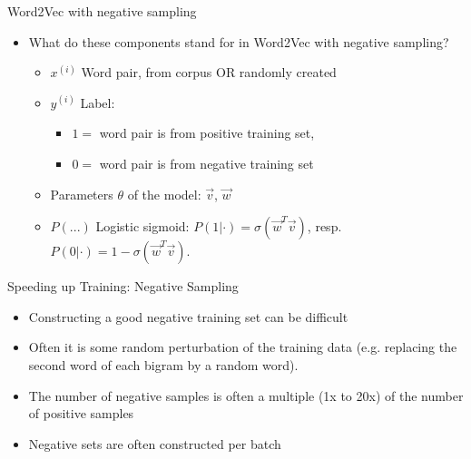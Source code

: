 \documentclass[11pt,compress,t,notes=noshow, xcolor=table]{beamer}
\begin{document}

\begin{vbframe}{Word2Vec with negative sampling}

\vfill

\begin{itemize}
	\item \ques What do these components stand for in Word2Vec with negative sampling?
		\begin{itemize}
			\item $x^{(i)}$ Word pair, from corpus OR randomly created
			\item $y^{(i)}$ Label: 
					\begin{itemize}
						\item $1 = $ word pair is from positive training set,
						\item $0 = $ word pair is from negative training set
					\end{itemize} 
			\item Parameters $\theta$ of the model: $\vec v$, $\vec w$
			\item $P(...)$ Logistic sigmoid: $P(1|\cdot) = \sigma(\vec w^T \vec v)$, resp. $P(0|\cdot) = 1-\sigma(\vec w^T \vec v)$.
		\end{itemize}
\end{itemize}

\vfill

\end{vbframe}


\begin{vbframe}{Speeding up Training: Negative Sampling}

\vfill

\begin{itemize}
	\item Constructing a good negative training set can be difficult
	\item Often it is some random perturbation of the training data (e.g. replacing the second word of each bigram by a random word).
	\item The number of negative samples is often a multiple (1x to 20x) of the number of positive samples
	\item Negative sets are often constructed per batch
\end{itemize}

\vfill

\end{vbframe}
\end{document}
